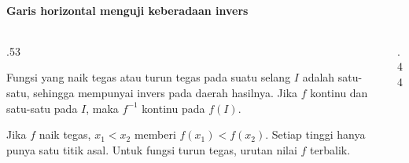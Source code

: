 \documentclass{../../kalkulus-ppt}
\begin{document}
\begin{frame}{\insertsection}
    \framesubtitle{Garis horizontal menguji keberadaan invers}
    \begin{columns}[c,onlytextwidth]
        \begin{column}{.53\textwidth}
            \begin{teorema}
                Fungsi yang naik tegas atau turun tegas pada suatu selang $I$
                adalah satu-satu, sehingga mempunyai invers pada daerah hasilnya.
                Jika $f$ kontinu dan satu-satu pada $I$, maka $f^{-1}$ kontinu pada $f(I)$.
            \end{teorema}
            Jika $f$ naik tegas, $x_1<x_2$ memberi $f(x_1)<f(x_2)$.
            Setiap tinggi hanya punya satu titik asal. Untuk fungsi turun tegas,
            urutan nilai $f$ terbalik.
        \end{column}
        \begin{column}{.44\textwidth}
            \centering
        \end{column}
    \end{columns}
\end{frame}
\end{document}
